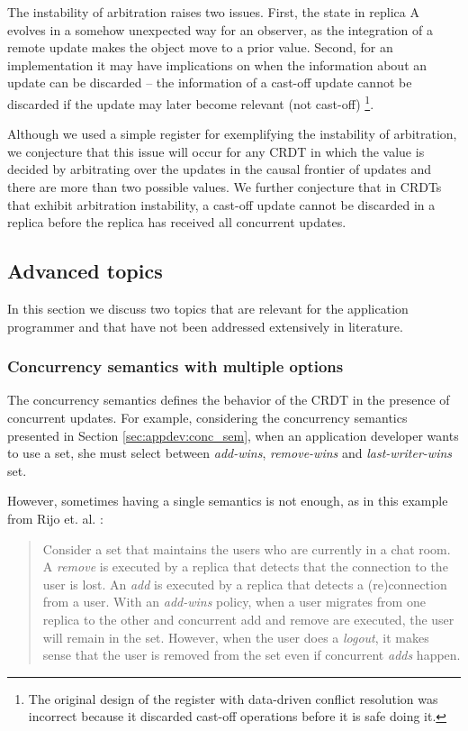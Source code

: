 \documentclass[11pt,a4paper]{article}
\begin{document}
The instability of arbitration raises two issues.
First, the state in replica A evolves in a somehow unexpected way for an observer, 
as the integration of a remote update makes the object move to a prior value.
Second, for an implementation it may have implications on when the information about
an update can be discarded -- the information of a cast-off update cannot be discarded
if the update may later become relevant (not cast-off) \footnote{The original design
of the register with data-driven conflict resolution \cite{Zawirski:2016:ECR:2911151.2911157} 
was incorrect because it discarded cast-off operations before it is safe doing it.}.

Although we used a simple register for exemplifying the instability of arbitration,
we conjecture that this issue will occur for any CRDT in which the value is 
decided by arbitrating over the updates in the causal frontier of updates and there
are more than two possible values. 
We further conjecture that in CRDTs that exhibit arbitration instability, 
a cast-off update cannot be discarded in a replica before the replica has received all
concurrent updates. 

\subsection{Advanced topics}

In this section we discuss two topics that are relevant for the application
programmer and that have not been addressed extensively in literature.

\subsubsection{Concurrency semantics with multiple options} 

The concurrency semantics defines the behavior of the CRDT in the
presence of concurrent updates. 
For example, considering the concurrency semantics presented in Section \ref{sec:appdev:conc_sem},
when an application developer wants to use a set, she must select between 
\emph{add-wins}, \emph{remove-wins} and \emph{last-writer-wins} set.

However, sometimes having a single semantics is not enough, as in this example
from Rijo et. al. \cite{addremovewins}:

\begin{quotation}
Consider a set that maintains the users who are currently in a chat room. 
A \emph{remove} is executed by a replica that detects that the connection to the user is lost. 
An \emph{add} is executed by a replica that detects a (re)connection from a user. 
With an \emph{add-wins} policy, when a user migrates from one replica 
to the other and concurrent add and remove are executed, the user will remain in the set.
However, when the user does a \emph{logout}, it makes sense that the 
user is removed from the set even if concurrent \emph{adds} happen. 
\end{quotation}
\end{document}
